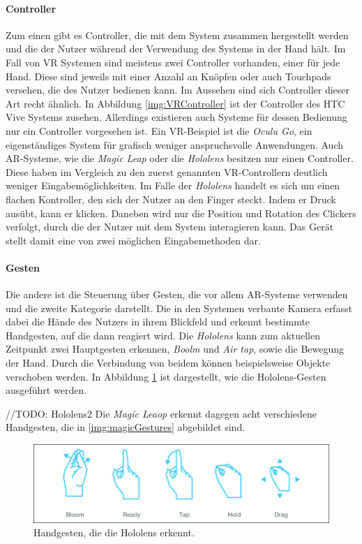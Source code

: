 \paragraph{Controller}
Zum einen gibt es Controller, die mit dem System zusammen hergestellt werden und die der Nutzer während der Verwendung des Systems in der Hand hält. Im Fall von VR Systemen sind meistens zwei Controller vorhanden, einer für jede Hand. Diese sind jeweils mit einer Anzahl an Knöpfen oder auch Touchpads versehen, die des Nutzer bedienen kann. Im Aussehen sind sich Controller dieser Art recht ähnlich. In Abbildung \ref{img:VRController} ist der Controller des HTC Vive Systems zusehen.
Allerdings existieren auch Systeme für dessen Bedienung nur ein Controller vorgesehen ist. Ein VR-Beispiel ist die \textit{Oculu Go}, ein eigenständiges System für grafisch weniger anspruchsvolle Anwendungen. 
Auch AR-Systeme, wie die \textit{Magic Leap} oder die \textit{Hololens} besitzen nur einen Controller. Diese haben im Vergleich zu den zuerst genannten VR-Controllern deutlich weniger Eingabemöglichkeiten. Im Falle der \textit{Hololens} handelt es sich um einen flachen Kontroller, den sich der Nutzer an den Finger steckt. Indem er Druck ausübt, kann er klicken. Daneben wird nur die Position und Rotation des Clickers verfolgt, durch die der Nutzer mit dem System interagieren kann. Das Gerät stellt damit eine von zwei möglichen Eingabemethoden dar. 

\paragraph{Gesten}
Die andere ist die Steuerung über Gesten, die vor allem AR-Systeme verwenden und die zweite Kategorie darstellt.
Die in den Systemen verbaute Kamera erfasst dabei die Hände des Nutzers in ihrem Blickfeld und erkennt bestimmte Handgesten, auf die dann reagiert wird. 
Die \textit{Hololens} kann zum aktuellen Zeitpunkt zwei Hauptgesten erkennen, \textit{Boolm} und \textit{Air tap}, sowie die Bewegung der Hand. Durch die Verbindung von beidem können beispielsweise Objekte verschoben werden. In Abbildung \ref{img:hololensGestures} ist dargestellt, wie die Hololens-Gesten ausgeführt werden. 

//TODO: 
Hololens2
Die \textit{Magic Leaop} erkennt dagegen acht verschiedene Handgesten, die in \ref{img:magicGestures} abgebildet sind. 


\begin{figure}
	\centering
	\includegraphics[width=0.7\linewidth]{images/hololensGestures.png}
	\caption{Handgesten, die die Hololens erkennt.}
	\label{img:hololensGestures}
\end{figure}


